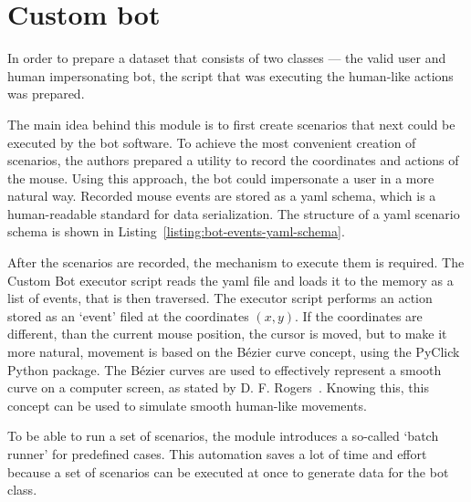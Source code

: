 \section{Custom bot}\label{sec:custom-bot}
In order to prepare a dataset that consists of two classes --- the valid user and human impersonating bot, the script that was executing the human-like actions was prepared.

The main idea behind this module is to first create scenarios that next could be executed by the bot software.
To achieve the most convenient creation of scenarios, the authors prepared a utility to record the coordinates and actions of the mouse.
Using this approach, the bot could impersonate a user in a more natural way.
Recorded mouse events are stored as a \gls{yaml} schema, which is a human-readable standard for data serialization.
The structure of a \gls{yaml} scenario schema is shown in Listing~\ref{listing:bot-events-yaml-schema}.


After the scenarios are recorded, the mechanism to execute them is required.
The Custom Bot executor script reads the \gls{yaml} file and loads it to the memory as a list of events, that is then traversed.
The executor script performs an action stored as an `event' filed at the coordinates $(x, y)$.
If the coordinates are different, than the current mouse position, the cursor is moved, but to make it more natural, movement is based on the Bézier curve concept, using the PyClick Python package.
The Bézier curves are used to effectively represent a smooth curve on a computer screen, as stated by D. F. Rogers~\cite{bezier-curves}.
Knowing this, this concept can be used to simulate smooth human-like movements.

To be able to run a set of scenarios, the module introduces a so-called `batch runner' for predefined cases.
This automation saves a lot of time and effort because a set of scenarios can be executed at once to generate data for the bot class.

